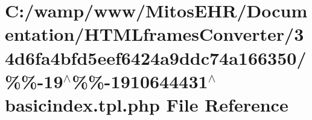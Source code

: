 \hypertarget{34d6fa4bfd5eef6424a9ddc74a166350_2_06_06-19_05_06_06-1910644431_05basicindex_8tpl_8php}{\section{\-C\-:/wamp/www/\-Mitos\-E\-H\-R/\-Documentation/\-H\-T\-M\-Lframes\-Converter/34d6fa4bfd5eef6424a9ddc74a166350/\%\%-\/19$^\wedge$\%\%-\/1910644431$^\wedge$basicindex.tpl.\-php \-File \-Reference}
\label{34d6fa4bfd5eef6424a9ddc74a166350_2_06_06-19_05_06_06-1910644431_05basicindex_8tpl_8php}
}
